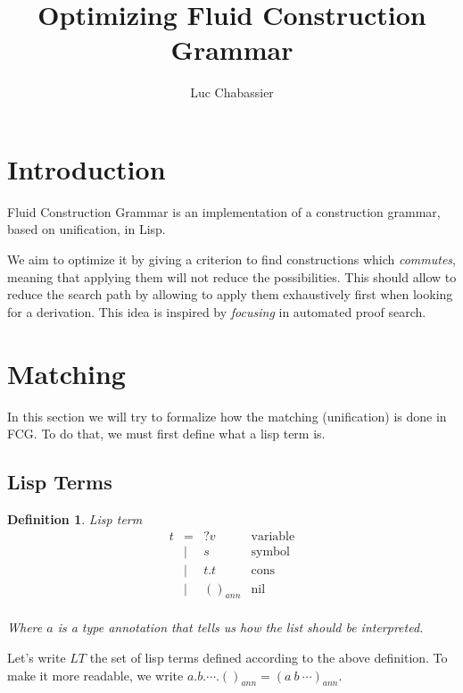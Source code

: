 \documentclass[]{article}
\newcommand{\1}{\mathbbm{1}}
\newcommand{\0}{\mathbbm{0}}
\newtheorem{defi}{Definition}
\begin{document}
\title{Optimizing Fluid Construction Grammar}
\author{Luc Chabassier}
\maketitle

\tableofcontents

\section{Introduction}

Fluid Construction Grammar is an implementation of a construction grammar,
based on unification, in Lisp.

We aim to optimize it by giving a criterion to find constructions which
\emph{commutes}, meaning that applying them will not reduce the possibilities.
This should allow to reduce the search path by allowing to apply them
exhaustively first when looking for a derivation. This idea is inspired by
\emph{focusing} in automated proof search.

\section{Matching}

In this section we will try to formalize how the matching (unification) is done
in FCG. To do that, we must first define what a lisp term is.

\subsection{Lisp Terms}

\begin{defi}{Lisp term}
    \[\begin{array}{rcll}
        t & = & ?v       & \text{variable} \\
          & | & s        & \text{symbol}   \\
          & | & t . t    & \text{cons}     \\
          & | & ()_{ann} & \text{nil}      \\
    \end{array}\]

    Where $a$ is a type annotation that tells us how the list should be
    interpreted.
\end{defi}

Let's write $LT$ the set of lisp terms defined according to the above
definition. To make it more readable, we write
$a.b.\cdots.()_{ann} = (a\ b\ \cdots)_{ann}$.
\end{document}
